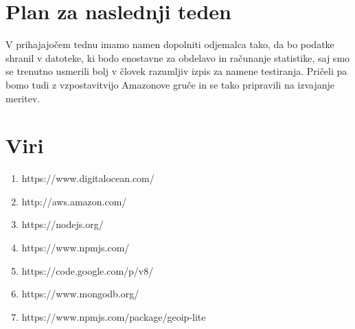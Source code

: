 \documentclass[11pt]{article}
\begin{document}
\section{Plan za naslednji teden}
V prihajajočem tednu imamo namen dopolniti odjemalca tako, da bo podatke shranil v datoteke, ki bodo enostavne za obdelavo in računanje statistike, saj smo se trenutno usmerili bolj v človek razumljiv izpis za namene testiranja. Pričeli pa bomo tudi z vzpostavitvijo Amazonove gruče in se tako pripravili na izvajanje meritev.

\section{Viri}
\begin{enumerate}
  \item https://www.digitalocean.com/
  \item http://aws.amazon.com/
  \item https://nodejs.org/
  \item https://www.npmjs.com/
  \item https://code.google.com/p/v8/
  \item https://www.mongodb.org/
  \item https://www.npmjs.com/package/geoip-lite
\end{enumerate}
\end{document}
